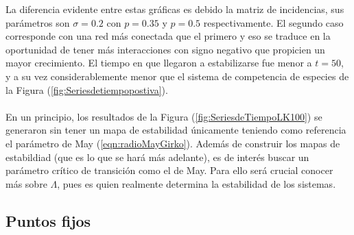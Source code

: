 La diferencia evidente entre estas gráficas es debido la matriz de incidencias, sus parámetros son $\sigma=0.2$ con $p=0.35$ y $p=0.5$ respectivamente. El segundo caso corresponde con una red más conectada que el primero y eso se traduce en la oportunidad de tener más interacciones con signo negativo que propicien un mayor crecimiento. El tiempo en que llegaron a estabilizarse fue menor a $t=50$, y a su vez considerablemente menor que el sistema de competencia de especies de la Figura (\ref{fig:Seriesdetiempopostiva}). 
\\
\\
En un principio, los resultados de la Figura (\ref{fig:SeriesdeTiempoLK100}) se generaron sin tener un mapa de estabilidad únicamente teniendo como referencia el parámetro de May (\ref{eqn:radioMayGirko}). Además de construir los mapas de estabildiad (que es lo que se hará más adelante), es de interés buscar un parámetro crítico de transición como el de May. Para ello será crucial conocer más sobre $\Lambda$, pues es quien realmente determina la estabilidad de los sistemas.

\subsection{Puntos fijos}

